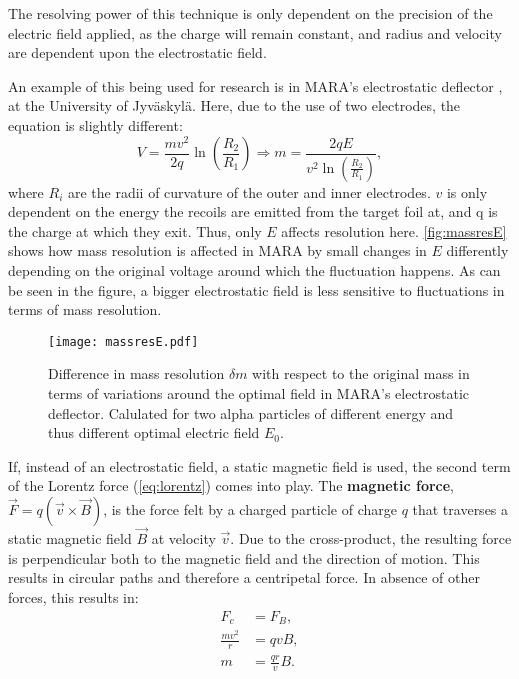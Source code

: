 The resolving power of this technique is only dependent on the precision of the electric field applied, as the charge will remain constant, and radius and velocity are dependent upon the electrostatic field. 

An example of this being used for research is in MARA's electrostatic deflector \cite{saren}, at the University of Jyväskylä. Here, due to the use of two electrodes, the equation is slightly different:
\begin{equation}
    \label{eq:maraE}
    V = \frac{mv^2}{2q}\ln{\left(\frac{R_2}{R_1}\right)} \Rightarrow m = \frac{2qE}{v^2 \ln{\left(\frac{R_2}{R_1}\right)}},
\end{equation} where $R_i$ are the radii of curvature of the outer and inner electrodes. $v$ is only dependent on the energy the recoils are emitted from the target foil at, and q is the charge at which they exit. Thus, only $E$ affects resolution here. \autoref{fig:massresE} shows how mass resolution is affected in MARA by small changes in $E$ differently depending on the original voltage around which the fluctuation happens. As can be seen in the figure, a bigger electrostatic field is less sensitive to fluctuations in terms of mass resolution.

\begin{figure}[H]
    \centering
     \texttt{[image: massresE.pdf]}
     \caption{Difference in mass resolution $\delta m$ with respect to the original mass in terms of variations around the optimal field in MARA's electrostatic deflector. Calulated for two alpha particles of different energy and thus different optimal electric field $E_0$.}
     \label{fig:massresE}
 \end{figure}

If, instead of an electrostatic field, a static magnetic field is used, the second term of the Lorentz force (\autoref{eq:lorentz}) comes into play. The \textbf{magnetic force}, $\vec{F} = q(\vec v \times \vec B)$, is the force felt by a charged particle of charge $q$ that traverses a static magnetic field $\vec B$ at velocity $\vec v$. Due to the cross-product, the resulting force is perpendicular both to the magnetic field and the direction of motion. This results in circular paths and therefore a centripetal force. In absence of other forces, this results in:
\begin{align}
    \label{eq:centripetalB}
    F_c &= F_B, \\
    \frac{mv^2}{r} &= qvB, \\
    m &= \frac{qr}{v}B.
\end{align}

